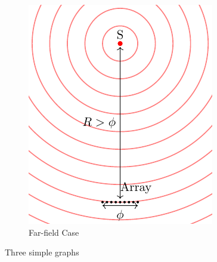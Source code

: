 \begin{figure}
\begin{subfigure}[b]{0.45\textwidth}
        \includegraphics[width=\textwidth]{FarField.pdf}
        \caption{Far-field Case}
        \label{fig:three sin x}
    \end{subfigure}
    \caption{Three simple graphs}
    \label{fig:three graphs}
\end{figure}



